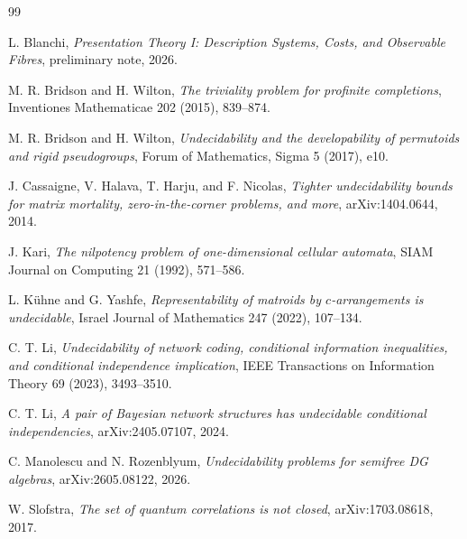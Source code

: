\documentclass[11pt]{article}
\begin{document}
\begin{thebibliography}{99}

L. Blanchi,
\emph{Presentation Theory I: Description Systems, Costs, and Observable Fibres},
preliminary note, 2026.

M. R. Bridson and H. Wilton,
\emph{The triviality problem for profinite completions},
Inventiones Mathematicae 202 (2015), 839--874.

M. R. Bridson and H. Wilton,
\emph{Undecidability and the developability of permutoids and rigid pseudogroups},
Forum of Mathematics, Sigma 5 (2017), e10.

J. Cassaigne, V. Halava, T. Harju, and F. Nicolas,
\emph{Tighter undecidability bounds for matrix mortality, zero-in-the-corner problems, and more},
arXiv:1404.0644, 2014.

J. Kari,
\emph{The nilpotency problem of one-dimensional cellular automata},
SIAM Journal on Computing 21 (1992), 571--586.

L. K\"uhne and G. Yashfe,
\emph{Representability of matroids by \(c\)-arrangements is undecidable},
Israel Journal of Mathematics 247 (2022), 107--134.

C. T. Li,
\emph{Undecidability of network coding, conditional information inequalities, and conditional independence implication},
IEEE Transactions on Information Theory 69 (2023), 3493--3510.

C. T. Li,
\emph{A pair of Bayesian network structures has undecidable conditional independencies},
arXiv:2405.07107, 2024.

C. Manolescu and N. Rozenblyum,
\emph{Undecidability problems for semifree DG algebras},
arXiv:2605.08122, 2026.

W. Slofstra,
\emph{The set of quantum correlations is not closed},
arXiv:1703.08618, 2017.

\end{thebibliography}
\end{document}
